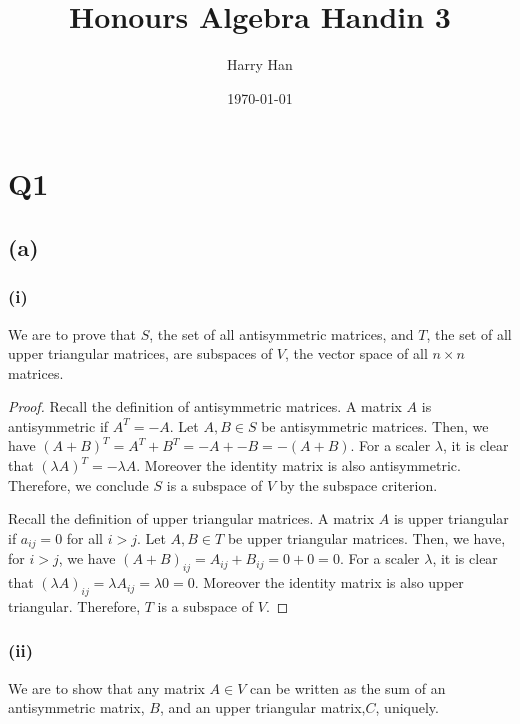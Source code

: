 \documentclass[12pt, a4paper]{article}
\title{Honours Algebra Handin 3}
\author{Harry Han}
\date{\today}
\theoremstyle{definition}
\theoremstyle{remark}
\begin{document}
\maketitle
\section{Q1}
\subsection{(a)}
\subsubsection{(i)}

We are to prove that $S$, the set of all antisymmetric matrices, and $T$, the set of all upper triangular matrices, are subspaces of $V$, the vector space of all $n \times n$ matrices.

\begin{proof}
    Recall the definition of antisymmetric matrices. A matrix $A$ is antisymmetric if $A^T = -A$. Let $A, B \in S$ be antisymmetric matrices. Then, we have 
	$
		(A + B)^T = A^T + B^T 
		= -A + -B 
		= -(A + B)
	$. For a scaler $\lambda$, it is clear that $(\lambda A)^T = -\lambda A$. Moreover the identity matrix is also antisymmetric. Therefore, we conclude $S$ is a subspace of $V$ by the subspace criterion.

	Recall the definition of upper triangular matrices. A matrix $A$ is upper triangular if $a_{ij} = 0$ for all $i > j$. Let $A, B \in T$ be upper triangular matrices. Then, we have, for $i>j$, we have
	$
		(A + B)_{ij} = A_{ij} + B_{ij} = 0 + 0 = 0
	$. For a scaler $\lambda$, it is clear that $(\lambda A)_{ij} = \lambda A_{ij} = \lambda 0 = 0$. Moreover the identity matrix is also upper triangular. Therefore, $T$ is a subspace of $V$.
\end{proof}

\subsubsection{(ii)}

We are to show that any matrix $A \in V$ can be written as the sum of an antisymmetric matrix, $B$, and an upper triangular matrix,$C$, uniquely.
\end{document}
